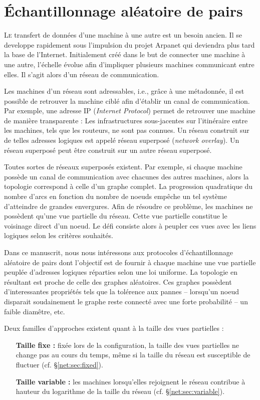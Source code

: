 
\chapter{Échantillonnage aléatoire de pairs}
\label{net:chap:rps}
\minitoc

\lettrine{L}e transfert de données d'une machine à une autre est un besoin
ancien. Il se developpe rapidement sous l'impulsion du projet Arpanet qui
deviendra plus tard la base de l'Internet. Initialement créé dans le but de
connecter une machine à une autre, l'échelle évolue afin d'impliquer plusieurs
machines communicant entre elles. Il s'agit alors d'un réseau de communication.

Les machines d'un réseau sont adressables, i.e., grâce à une métadonnée, il est
possible de retrouver la machine ciblé afin d'établir un canal de
communication. Par exemple, une adresse IP (\emph{Internet Protocol}) permet de
retrouver une machine de manière transparente : Les infrastructures
sous-jacentes sur l'itinéraire entre les machines, tels que les routeurs, ne
sont pas connues. Un réseau construit sur de telles adresses logiques est appelé
réseau superposé (\emph{network overlay}). Un réseau superposé peut être
construit sur un autre réseau superposé.

Toutes sortes de réseaux superposés existent. Par exemple, si chaque machine
possède un canal de communication avec chacunes des autres machines, alors la
topologie correspond à celle d'un graphe complet. La progression quadratique du
nombre d'arcs en fonction du nombre de noeuds empêche un tel système d'atteindre
de grandes envergures. Afin de résoudre ce problème, les machines ne possèdent
qu'une vue partielle du réseau. Cette vue partielle constitue le voisinage
direct d'un noeud. Le défi consiste alors à peupler ces vues avec les liens
logiques selon les critères souhaités.

Dans ce manuscrit, nous nous intéressons aux protocoles d'échantillonnage
aléatoire de pairs dont l'objectif est de fournir à chaque machine une vue
partielle peuplée d'adresses logiques réparties selon une loi uniforme. La
topologie en résultant est proche de celle des graphes aléatoires. Ces graphes
possèdent d'interessantes propriétés tels que la tolérence aux pannes --
lorsqu'un noeud disparait soudainement le graphe reste connecté avec une forte
probabilité -- un faible diamêtre, etc.

Deux familles d'approches existent quant à la taille des vues partielles :
\begin{itemize}
\item [\textbf{Taille fixe :}] fixée lors de la configuration, la taille des
  vues partielles ne change pas au cours du temps, même si la taille du réseau
  est susceptible de fluctuer (cf. §\ref{net:sec:fixed}).
\item [\textbf{Taille variable :}] les machines lorsqu'elles rejoignent le
  réseau contribue à hauteur du logarithme de la taille du réseau
  (cf. §\ref{net:sec:variable}).
\end{itemize}

